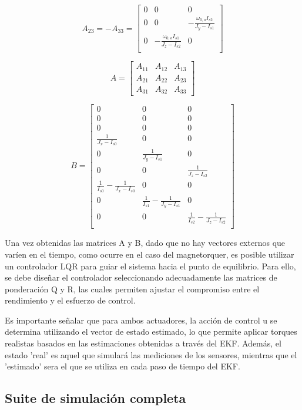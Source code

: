 \[
A_{23} = -A_{33} = 
\begin{bmatrix}
	0 & 0 & 0 \\
	0 & 0 & -\frac{\omega_{0,o} I_{s2}}{J_y - I_{s1}}
	 \\
	0 & -\frac{\omega_{0,o} I_{s1}}{J_z - I_{s2}}
	 & 0 \\
\end{bmatrix}
\]

\[
A =
\begin{bmatrix}
	A_{11} & A_{12} & A_{13} \\
	A_{21} & A_{22} & A_{23} \\
	A_{31} & A_{32} & A_{33}
\end{bmatrix}
\]

\[
B =
\begin{bmatrix}
	0 & 0 & 0 \\
	0 & 0 & 0 \\
	0 & 0 & 0 \\
	\frac{1}{J_{x}-I_{s0}} & 0 & 0 \\
	0 & \frac{1}{J_{y}-I_{s1}} & 0 \\
	0 & 0 & \frac{1}{J_{z}-I_{s2}} \\
	\frac{1}{I_{s0}} - \frac{1}{J_{x}-I_{s0}} & 0 & 0 \\
	0 & \frac{1}{I_{s1}} - \frac{1}{J_{y}-I_{s1}} & 0 \\
	0 & 0 & \frac{1}{I_{s2}} - \frac{1}{J_{z}-I_{s2}} \\
\end{bmatrix}
\]

Una vez obtenidas las matrices A y B, dado que no hay vectores externos que varíen en el tiempo, como ocurre en el caso del magnetorquer, es posible utilizar un controlador LQR para guiar el sistema hacia el punto de equilibrio. Para ello, se debe diseñar el controlador seleccionando adecuadamente las matrices de ponderación Q y R, las cuales permiten ajustar el compromiso entre el rendimiento y el esfuerzo de control.

Es importante señalar que para ambos actuadores, la acción de control u se determina utilizando el vector de estado estimado, lo que permite aplicar torques realistas basados en las estimaciones obtenidas a través del \gls{EKF}. Además, el estado 'real' es aquel que simulará las mediciones de los sensores, mientras que el 'estimado' sera el que se utiliza en cada paso de tiempo del \gls{EKF}.

\subsection{Suite de simulación completa}

